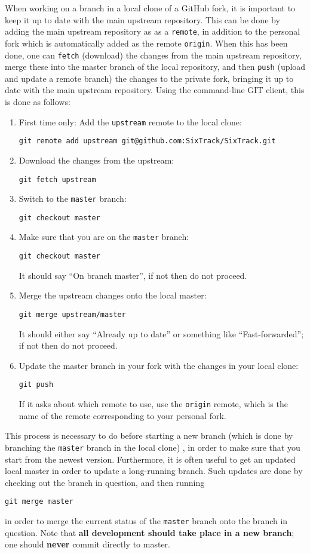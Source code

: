 \documentclass[english,BCOR=0mm,DIV=18]{scrartcl}
\begin{document}
When working on a branch in a local clone of a GitHub fork, it is important to keep it up to date with the main upstream repository.
This can be done by adding the main upstream repository as as a \texttt{remote}, in addition to the personal fork which is automatically added as the remote \texttt{origin}.
When this has been done, one can \texttt{fetch} (download) the changes from the main upstream repository, merge these into the master branch of the local repository, and then \texttt{push} (upload and update a remote branch) the changes to the private fork, bringing it up to date with the main upstream repository.
Using the command-line GIT client, this is done as follows:
\begin{enumerate}
\item First time only: Add the \texttt{upstream} remote to the local clone:
\begin{lstlisting}
git remote add upstream git@github.com:SixTrack/SixTrack.git
\end{lstlisting}
\item Download the changes from the upstream:
\begin{lstlisting}
git fetch upstream
\end{lstlisting}
\item Switch to the \texttt{master} branch:
\begin{lstlisting}
git checkout master
\end{lstlisting}
\item Make sure that you are on the \texttt{master} branch:
\begin{lstlisting}
git checkout master
\end{lstlisting}
It should say ``On branch master'', if not then do not proceed.
\item Merge the upstream changes onto the local master:
\begin{lstlisting}
git merge upstream/master
\end{lstlisting}
It should either say ``Already up to date'' or something like ``Fast-forwarded''; if not then do not proceed.
\item Update the master branch in your fork with the changes in your local clone:
\begin{lstlisting}
git push
\end{lstlisting}
If it asks about which remote to use, use the \texttt{origin} remote, which is the name of the remote corresponding to your personal fork.
\end{enumerate}
This process is necessary to do before starting a new branch (which is done by branching the \texttt{master} branch in the local clone) , in order to make sure that you start from the newest version.
Furthermore, it is often useful to get an updated local master in order to update a long-running branch.
Such updates are done by checking out the branch in question, and then running
\begin{lstlisting}
git merge master
\end{lstlisting}
in order to merge the current status of the \texttt{master} branch onto the branch in question.
Note that \textbf{all development should take place in a new branch}; one should \textbf{never} commit directly to master.
\end{document}
